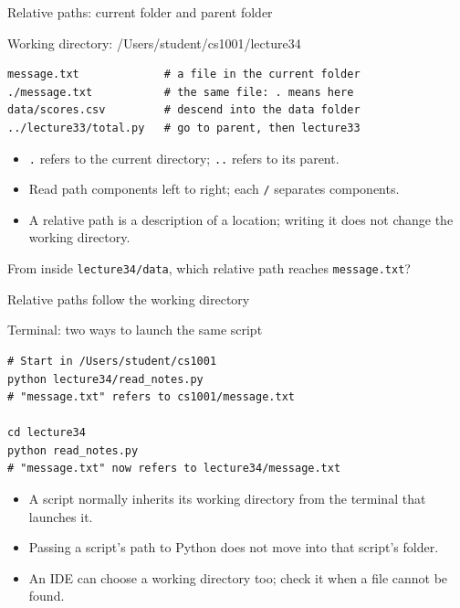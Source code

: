 \documentclass[aspectratio=169,10pt]{beamer}
\begin{document}
\begin{frame}[fragile]{Relative paths: current folder and parent folder}
\begin{block}{Working directory: /Users/student/cs1001/lecture34}
\begin{Verbatim}[fontsize=\footnotesize]
message.txt             # a file in the current folder
./message.txt           # the same file: . means here
data/scores.csv         # descend into the data folder
../lecture33/total.py   # go to parent, then lecture33
\end{Verbatim}
\end{block}
\small\begin{itemize}
\item \texttt{.} refers to the current directory; \texttt{..} refers to its parent.
\item Read path components left to right; each \texttt{/} separates components.
\item A relative path is a description of a location; writing it does not change the working directory.
\end{itemize}
\begin{activity}\small From inside \texttt{lecture34/data}, which relative path reaches \texttt{message.txt}?\end{activity}
\end{frame}

\begin{frame}[fragile]{Relative paths follow the working directory}
\begin{block}{Terminal: two ways to launch the same script}
\begin{Verbatim}[fontsize=\scriptsize]
# Start in /Users/student/cs1001
python lecture34/read_notes.py
# "message.txt" refers to cs1001/message.txt

cd lecture34
python read_notes.py
# "message.txt" now refers to lecture34/message.txt
\end{Verbatim}
\end{block}
\small\begin{itemize}
\item A script normally inherits its working directory from the terminal that launches it.
\item Passing a script's path to Python does not move into that script's folder.
\item An IDE can choose a working directory too; check it when a file cannot be found.
\end{itemize}
\end{frame}
\end{document}
